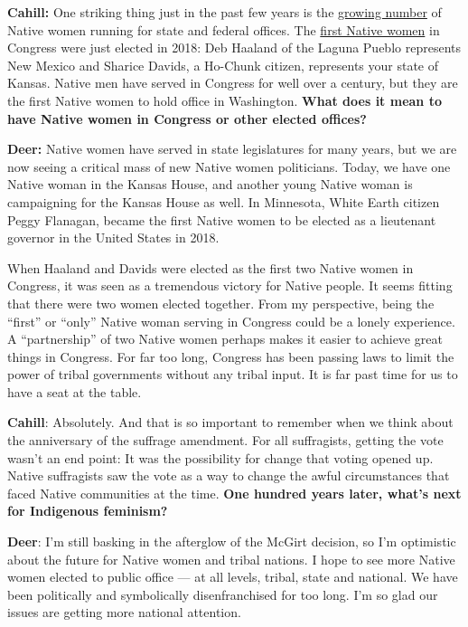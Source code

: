 \textbf{Cahill:} One striking thing just in the past few years is the
\href{https://www.npr.org/2018/07/04/625425037/record-number-of-native-americans-running-for-office-in-midterms}{growing
number} of Native women running for state and federal offices. The
\href{https://www.nytimes.com/2018/11/07/us/elections/native-americans-congress-haaland-davids.html}{first
Native women} in Congress were just elected in 2018: Deb Haaland of the
Laguna Pueblo represents New Mexico and Sharice Davids, a Ho-Chunk
citizen, represents your state of Kansas. Native men have served in
Congress for well over a century, but they are the first Native women to
hold office in Washington. \textbf{What does it mean to have Native
women in Congress or other elected offices?}

\textbf{Deer:} Native women have served in state legislatures for many
years, but we are now seeing a critical mass of new Native women
politicians. Today, we have one Native woman in the Kansas House, and
another young Native woman is campaigning for the Kansas House as well.
In Minnesota, White Earth citizen Peggy Flanagan, became the first
Native women to be elected as a lieutenant governor in the United States
in 2018.

When Haaland and Davids were elected as the first two Native women in
Congress, it was seen as a tremendous victory for Native people. It
seems fitting that there were two women elected together. From my
perspective, being the ``first'' or ``only'' Native woman serving in
Congress could be a lonely experience. A ``partnership'' of two Native
women perhaps makes it easier to achieve great things in Congress. For
far too long, Congress has been passing laws to limit the power of
tribal governments without any tribal input. It is far past time for us
to have a seat at the table.

\textbf{Cahill}: Absolutely. And that is so important to remember when
we think about the anniversary of the suffrage amendment. For all
suffragists, getting the vote wasn't an end point: It was the
possibility for change that voting opened up. Native suffragists saw the
vote as a way to change the awful circumstances that faced Native
communities at the time. \textbf{One hundred years later, what's next
for Indigenous feminism?}

\textbf{Deer}: I'm still basking in the afterglow of the McGirt
decision, so I'm optimistic about the future for Native women and tribal
nations. I hope to see more Native women elected to public office --- at
all levels, tribal, state and national. We have been politically and
symbolically disenfranchised for too long. I'm so glad our issues are
getting more national attention.

